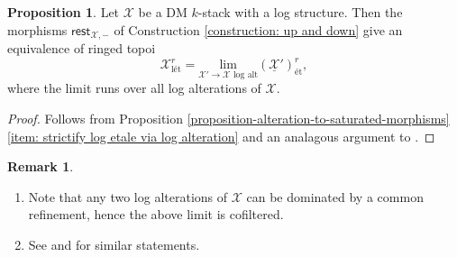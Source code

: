 \documentclass[11pt]{amsart}
\newcommand{\XYHcomment}[1]{\textcolor{brown}{[XYH: #1]}}
\theoremstyle{definition}
\theoremstyle{definition}
\newtheorem{proposition}[theorem]{Proposition}
\newtheorem{remark}[theorem]{Remark}
\newcommand{\cU}{\mathcal{U}}
\newcommand{\cX}{\mathcal{X}}
\newcommand{\ul}[1]{\underline{#1}}
\newcommand{\cal}{\mathcal}
\def\cU{{\cal U}}
\def\cX{{\cal X}}
\begin{document}
\begin{proposition}\label{proposition on log etale topos}
Let $\mathcal{X}$ be a DM $k$-stack with a log structure. Then the morphisms $\mathsf{rest}_{\cX,-}$ of Construction \ref{construction: up and down} give an equivalence of ringed topoi
\[\cX^{r}_{\text{l\'et}}=\underset{\cX'\rightarrow \cX\text{ log alt}}{\mathrm{lim}}(\ul{\cX}')^{r}_{\text{\'et}},\]
where the limit runs over all log alterations of $\cX$.
\end{proposition}
\begin{proof}
    Follows from Proposition \ref{proposition-alteration-to-saturated-morphisms} \eqref{item: strictify log etale via log alteration} and an analagous argument to \cite[Proposition 5.6~(1)]{Log-etale-cohomology-Chikara-Nakayama}.
\end{proof}
\begin{remark}
\begin{enumerate}
    \item Note that any two log alterations of $\cX$ can be dominated by a common refinement, hence the above limit is cofiltered.
    \item See \cite[Lemma 4.1]{molcho2023remarks} and \cite[Proposition 5.6]{Log-etale-cohomology-Chikara-Nakayama} for similar statements.
\end{enumerate}
\end{remark}
%
\end{document}
